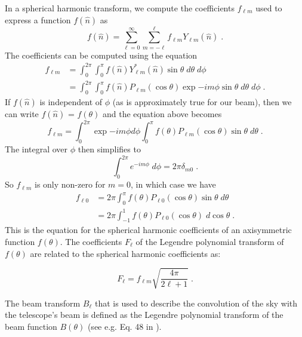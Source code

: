 In a spherical harmonic transform, we compute the coefficients $f_{\ell m}$ used to express a function $f (\hat{n})$ as
\begin{equation}
    f(\hat{n}) = \sum_{\ell=0}^{\infty}\sum_{m=-\ell}^{\ell}f_{\ell m} Y_{\ell m}(\hat{n}) \; .
\end{equation} 
The coefficients can be computed using the equation 
\begin{subequations}
\begin{align}
    f_{\ell m} &= \int_{0}^{2\pi}\int_{0}^{\pi} f(\hat{n}) Y_{\ell m}^{*}(\hat{n})\sin\theta \; d\theta\; d\phi   \\
    & = \int_{0}^{2\pi}\int_{0}^{\pi} f(\hat{n}) P_{\ell m}(\cos\theta)\exp{-im\phi} \sin\theta\; d\theta\; d\phi \; .
\end{align}
\end{subequations}
If $f (\hat{n})$ is independent of $\phi$ (as is approximately true for our beam), then we can write $f (\hat{n})$ = $f (\theta)$ and the equation above becomes
\begin{equation}
    f_{\ell m}= \int_{0}^{2\pi}\exp{-im\phi}d\phi\int_{0}^{\pi} f(\theta) P_{\ell m}(\cos\theta) \sin\theta\; d\theta \; .
\end{equation}
The integral over $\phi$ then simplifies to 
\begin{equation}
    \int_0^{2\pi} e^{-im\phi}\; d\phi = 2\pi \delta_{m0}\; .
\end{equation}
So $f_{\ell m}$ is only non-zero for $m=0$, in which case we have 
\begin{subequations}
\begin{align}
    f_{\ell 0} & =  2\pi\int_0^{\pi}f(\theta)P_{\ell 0}(\cos\theta)\sin\theta \; d\theta\\
    & = 2\pi \int_{-1}^{1}f(\theta)P_{\ell 0} (\cos\theta) \; d\cos \theta\; .
\end{align}
\end{subequations}
This is the equation for the spherical harmonic coefficients of an axisymmetric function $f(\theta)$. The coefficients $F_\ell$ of the Legendre polynomial transform of $f(\theta)$ are related to the spherical harmonic coefficients as:

\begin{equation}
    F_\ell = f_{\ell m} \sqrt{\frac{4\pi}{2\ell+1}}\; .
\end{equation}

The beam transform $B_\ell$ that is used to describe the convolution of the sky with the telescope’s beam is defined as the Legendre polynomial transform of the beam function $B(\theta)$ (see e.g. Eq. 48 in \cite{challinor_2000}).